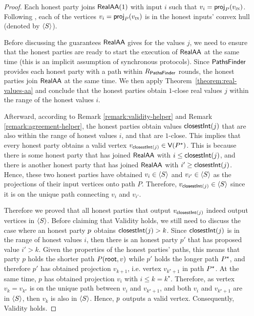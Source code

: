 \begin{proof}
    Each honest party joins $\textsf{RealAA}(1)$ with input $i$ such that $v_i = \textsf{proj}_{P}(v_{\textsc{in}})$. Following , each of the vertices $v_i = \textsf{proj}_{P}(v_{\textsc{in}})$ is in the honest inputs' convex hull (denoted by $\langle{S}\rangle$).

    Before discussing the guarantees $\textsf{RealAA}$ gives for the values $j$, we need to ensure that the honest parties are ready to start the execution of  $\textsf{RealAA}$ at the same time (this is an implicit assumption of synchronous protocols).  Since $\textsf{PathsFinder}$ provides each honest party with a path within $R_{\textsf{PathsFinder}}$ rounds, the honest parties join $\textsf{RealAA}$ at the same time. We then apply Theorem~\ref{theorem:real-values-aa} and conclude that the honest parties obtain $1$-close real values $j$ within the range of the honest values $i$. 
    
    Afterward, according to Remark \ref{remark:validity-helper} and Remark \ref{remark:agreement-helper}, the honest parties obtain values $\textsf{closestInt}(j)$ that are also within the range of honest values $i$, and that are $1$-close. 
    This implies that every honest party obtains a valid vertex $v_{\textsf{closestInt}(j)} \in \textsf{V}(P^\star)$. This is because there is some honest party that has joined $\textsf{RealAA}$ with $i \leq \textsf{closestInt}(j)$, and there is another honest party that has joined $\textsf{RealAA}$ with $i' \geq \textsf{closestInt}(j)$. Hence, these two honest parties have obtained $v_i \in \langle{S}\rangle$ and $v_{i'} \in \langle{S}\rangle$ as the projections of their input vertices onto path $P$. Therefore, $v_{\textsf{closestInt}(j)} \in \langle{S}\rangle$ since it is  on the unique path connecting $v_i$ and $v_{i'}$. 

    Therefore we proved that all honest parties that output $v_{\textsf{closestInt}(j)}$ indeed output vertices in $\langle{S}\rangle$. Before claiming that Validity holds, we still need to discuss the case where an honest party $p$ obtains $\textsf{closestInt}(j) > k$. Since $\textsf{closestInt}(j)$ is in the range of honest values $i$, then there is an honest party $p'$ that has proposed value $i' > k$. Given the properties of the honest parties' paths, this means that party $p$ holds the shorter path $P(\textsf{root}, v)$ while $p'$ holds the longer path $P^\star$, and therefore $p'$ has obtained projection $v_{k + 1}$, i.e. vertex $v_{k^\star + 1}$ in path $P^\star$. At the same time, $p$ has obtained projection $v_i$ with $i \leq k = k^\star$. Therefore, as vertex $v_k = v_{k^\star}$ is on the unique path between $v_i$ and $v_{k^\star + 1}$, and both $v_i$ and $v_{k^\star + 1}$ are in $\langle{S}\rangle$, then $v_k$ is also in $\langle{S}\rangle$. Hence, $p$ outputs a valid vertex. Consequently, Validity holds.    



\end{proof}

